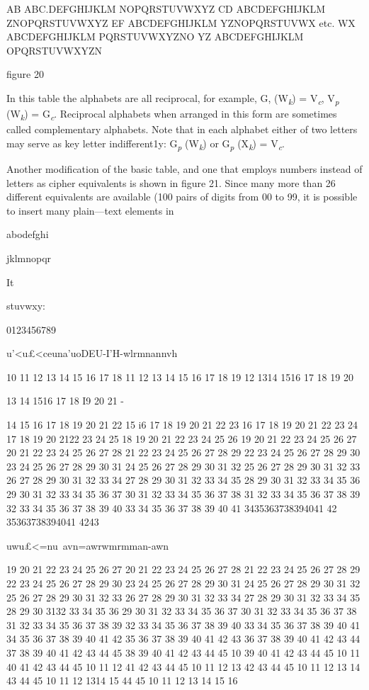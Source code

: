 AB ABC.DEFGHIJKLM
NOPQRSTUVWXYZ
CD ABCDEFGHIJKLM
ZNOPQRSTUVWXYZ
EF ABCDEFGHIJKLM
YZNOPQRSTUVWX
etc.
WX ABCDEFGHIJKLM
PQRSTUVWXYZNO
YZ ABCDEFGHIJKLM
OPQRSTUVWXYZN

figure 20

In this table the alphabets are all reciprocal, for example, G, (W\textsubscript{\textit{k}}) = V\textsubscript{\textit{c}},
V\textsubscript{\textit{p}} (W\textsubscript{\textit{k}}) = G\textsubscript{\textit{c}}. Reciprocal alphabets when arranged in this form are
sometimes called complementary alphabets. Note that in each alphabet
either of two letters may serve as key letter indifferent1y: G\textsubscript{\textit{p}} (W\textsubscript{\textit{k}}) or
G\textsubscript{\textit{p}} (X\textsubscript{\textit{k}}) = V\textsubscript{\textit{c}}.

\mypara Another modiﬁcation of the basic table, and one that employs numbers instead of letters as cipher equivalents is shown in ﬁgure 21. Since
many more than 26 different equivalents are available (100 pairs of
digits from 00 to 99, it is possible to insert many plain—text elements in
 

 

 

 

abodefghi

jklmnopqr

It

stuvwxy:

0123456789

 

u'<u£<ceuna'uoDEU-I'H-wlrmnannvh

10 11 12 13 14 15 16 17 18
11 12 13 14 15 16 17 18 19
12 1314 1516 17 18 19 20

13 14 1516 17 18 I9 20 21 -

14 15 16 17 18 19 20 21 22
15 i6 17 18 19 20 21 22 23
16 17 18 19 20 21 22 23 24
17 18 19 20 2122 23 24 25
18 19 20 21 22 23 24 25 26
19 20 21 22 23 24 25 26 27
20 21 22 23 24 25 26 27 28
21 22 23 24 25 26 27 28 29
22 23 24 25 26 27 28 29 30
23 24 25 26 27 28 29 30 31
24 25 26 27 28 29 30 31 32
25 26 27 28 29 30 31 32 33
26 27 28 29 30 31 32 33 34
27 28 29 30 31 32 33 34 35
28 29 30 31 32 33 34 35 36
29 30 31 32 33 34 35 36 37
30 31 32 33 34 35 36 37 38
31 32 33 34 35 36 37 38 39
32 33 34 35 36 37 38 39 40
33 34 35 36 37 38 39 40 41
3435363738394041 42
35363738394041 4243

uwu£<=nu~avn=awrwmrmman-awn

19 20 21 22 23 24 25 26 27
20 21 22 23 24 25 26 27 28
21 22 23 24 25 26 27 28 29
22 23 24 25 26 27 28 29 30
23 24 25 26 27 28 29 30 31
24 25 26 27 28 29 30 31 32
25 26 27 28 29 30 31 32 33
26 27 28 29 30 31 32 33 34
27 28 29 30 31 32 33 34 35
28 29 30 3132 33 34 35 36
29 30 31 32 33 34 35 36 37
30 31 32 33 34 35 36 37 38
31 32 33 34 35 36 37 38 39
32 33 34 35 36 37 38 39 40
33 34 35 36 37 38 39 40 41
34 35 36 37 38 39 40 41 42
35 36 37 38 39 40 41 42 43
36 37 38 39 40 41 42 43 44
37 38 39 40 41 42 43 44 45
38 39 40 41 42 43 44 45 10
39 40 41 42 43 44 45 10 11
40 41 42 43 44 45 10 11 12
41 42 43 44 45 10 11 12 13
42 43 44 45 10 11 12 13 14
43 44 45 10 11 12 1314 15
44 45 10 11 12 13 14 15 16

